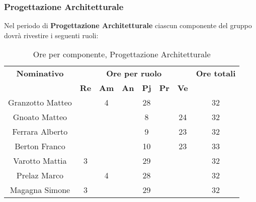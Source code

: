 \subsubsection{Progettazione Architetturale}
Nel periodo di \textbf{Progettazione Architetturale} ciascun componente del gruppo dovrà rivestire i seguenti ruoli:
\begin{table}[H]
	\begin{center}
		\begin{tabular}{|c|c|c|c|c|c|c|c|}
			\hline
			\textbf{Nominativo} & \multicolumn{6}{c|}{\textbf{Ore per ruolo}} & \textbf{Ore totali} \\
			& \textbf{Re} & \textbf{Am} & \textbf{An} & \textbf{Pj} & \textbf{Pr} & \textbf{Ve} & \\
			\hline
			Granzotto Matteo	&		&	 4	&  		&	28	&	 	& 		&	32	\\
			\hline
			Gnoato Matteo		&		&		&		&	8	&		&	24	&	32	\\
			\hline
			Ferrara Alberto		&		&		&		&	9 	&		&	23	& 	32	\\
			\hline
			Berton Franco		&		&		&		&	10	&		&	23	&	33	\\
			\hline
			Varotto Mattia 		&	3	&		&		&	29	&		&		& 	32	\\
			\hline
			Prelaz Marco 		& 		&	4	&		&	28	&		&		&	32	\\
			\hline
			Magagna Simone 		&	3	&		&		&	29	&		& 		&	32	\\
			\hline
		\end{tabular}
	\end{center}
	\caption{Ore per componente, Progettazione Architetturale}
\end{table}

